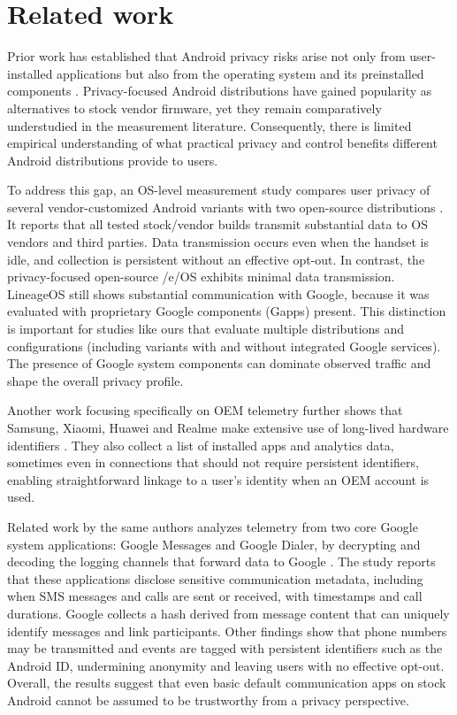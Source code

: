 \section{Related work}

Prior work has established that Android privacy risks arise not only from user-installed applications but also from the operating system and its preinstalled components \cite{android-os-snooping2021,android-os-snooping2023,google-dialer-messages,cookies-identifiers2025,google-data-collection2018}. Privacy-focused Android distributions have gained popularity as alternatives to stock vendor firmware, yet they remain comparatively understudied in the measurement literature. Consequently, there is limited empirical understanding of what practical privacy and control benefits different Android distributions provide to users.

To address this gap, an OS-level measurement study compares user privacy of several vendor-customized Android variants with two open-source distributions \cite{android-os-snooping2021}. It reports that all tested stock/vendor builds transmit substantial data to OS vendors and third parties. Data transmission occurs even when the handset is idle, and collection is persistent without an effective opt-out. In contrast, the privacy-focused open-source /e/OS exhibits minimal data transmission. LineageOS still shows substantial communication with Google, because it was evaluated with proprietary Google components (Gapps) present. This distinction is important for studies like ours that evaluate multiple distributions and configurations (including variants with and without integrated Google services). The presence of Google system components can dominate observed traffic and shape the overall privacy profile.

Another work focusing specifically on OEM telemetry further shows that Samsung, Xiaomi, Huawei and Realme make extensive use of long-lived hardware identifiers \cite{android-os-snooping2023}. They also collect a list of installed apps and analytics data, sometimes even in connections that should not require persistent identifiers, enabling straightforward linkage to a user’s identity when an OEM account is used.

Related work by the same authors analyzes telemetry from two core Google system applications: Google Messages and Google Dialer, by decrypting and decoding the logging channels that forward data to Google \cite{google-dialer-messages}. The study reports that these applications disclose sensitive communication metadata, including when SMS messages and calls are sent or received, with timestamps and call durations. Google collects a hash derived from message content that can uniquely identify messages and link participants. Other findings show that phone numbers may be transmitted and events are tagged with persistent identifiers such as the Android ID, undermining anonymity and leaving users with no effective opt-out. Overall, the results suggest that even basic default communication apps on stock Android cannot be assumed to be trustworthy from a privacy perspective.

